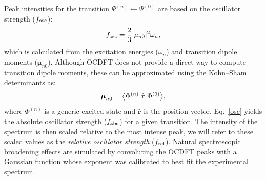 \documentclass{article}
\begin{document}
Peak intensities for the transition $\Psi^{(n)} \leftarrow \Psi^{(0)}$ are based on the oscillator strength ($f_{\rm osc} $):
  \begin{align}
  \label{osc}
  f_{\rm osc} = \frac{2}{3} |\mu_{n0}|^2 \omega_{n},
  \end{align}
which is calculated from the excitation energies ($\omega_{n}$) and transition dipole moments ($\boldsymbol{\mu}_{n0}$).
Although OCDFT does not provide a direct way to compute transition dipole moments, these can be approximated using the Kohn--Sham determinants as:
\begin{equation}
\boldsymbol{\mu}_{n0} = \bra[1]{\Phi^{(n)}} \hat{\textbf{r}}\ket[1]{\Phi^{(0)}},
\end{equation}
where $\Phi^{(n)}$ is a generic excited state and $\hat{\textbf{r}}$ is the position vector.
Eq.~\eqref{osc} yields the absolute oscillator strength ($f_{\rm abs}$) for a given transition. The intensity of the spectrum is then scaled relative to the most intense peak, we will refer to these scaled values as the \textit{relative oscillator strength} ($f_{\rm rel}$).
Natural spectroscopic broadening effects are simulated by convoluting the OCDFT peaks with a Gaussian function whose exponent was calibrated to best fit the experimental spectrum.
\end{document}

